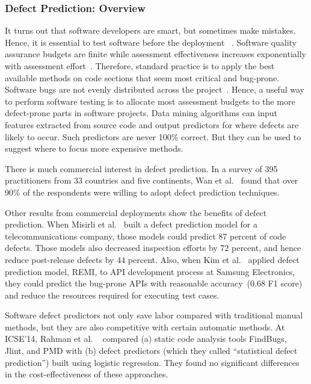 \documentclass[10pt,conference]{IEEEtran}
\begin{document}
\subsubsection{Defect Prediction: Overview}
It turns out that software developers are smart, but sometimes make mistakes. Hence, it is essential to test software before the deployment ~\cite{orso2014software,barr2015oracle,yoo2012regression, myers2011art}. 
 Software quality assurance budgets are finite while assessment effectiveness increases exponentially with assessment effort~\cite{Fu2016TuningFS}. Therefore,  standard practice is to apply the best available methods on code sections that seem most critical and bug-prone.
Software bugs are not evenly distributed across the project~\cite{hamill2009common,koru2009investigation, ostrand2004bugs,misirli2011ai}.  Hence, 
a useful way to perform software testing is to allocate most assessment budgets to
the more defect-prone parts in software projects.    Data mining algorithms can input
features extracted from source code and output predictors for where defects are likely to occur.
Such  predictors are never 100\% correct. But
they can be used to suggest where to focus more expensive methods. 

There is  much  commercial interest  in  defect prediction.  In a survey of  395 practitioners from 33 countries and five continents,
 Wan et al.~\cite{wan18} found that over 90\% of
 the respondents were willing to adopt defect prediction
 techniques. 
 
 Other results from commercial deployments show the benefits of defect prediction.
When Misirli et al.~\cite{misirli2011ai} built a  defect prediction model  for a telecommunications company, those  models
could  predict 87 percent of code defects.
Those models also decreased inspection efforts by 72 percent, and hence reduce post-release defects by 44 percent. Also, when Kim et al.~\cite{kim2015remi} applied defect prediction model, REMI, to API
development process at Samsung Electronics, they could
predict the bug-prone APIs with reasonable accuracy~(0.68 F1 score)
and reduce the resources required for executing test cases.



Software defect predictors not only save labor compared with traditional manual methods, but they are also competitive with certain automatic methods.  
At ICSE'14, Rahman et al. ~\cite{rahman2014comparing} compared (a) static code analysis tools FindBugs, Jlint, and PMD with (b) defect predictors (which they called ``statistical defect prediction'') built using logistic  regression.
They found no significant differences in the cost-effectiveness of these approaches.  
\end{document}
